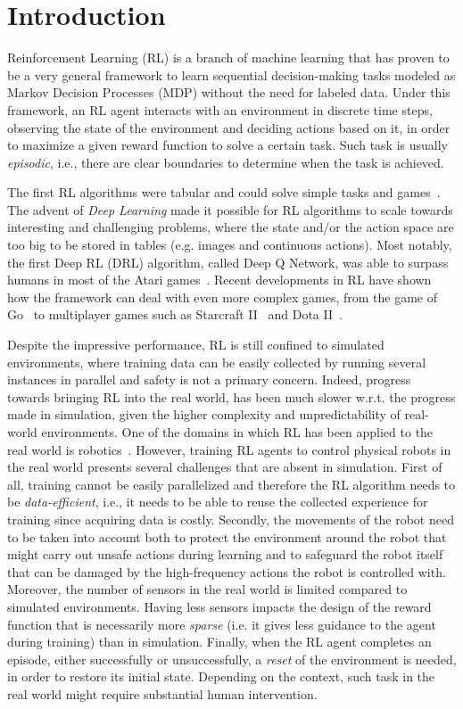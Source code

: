 \chapter{Introduction}

Reinforcement Learning (RL) is a branch of machine learning that has proven to be a very general framework to learn sequential decision-making tasks modeled as Markov Decision Processes (MDP) \citep{vanOtterlo2012} without the need for labeled data. Under this framework, an RL agent interacts with an environment in discrete time steps, observing the state of the environment and deciding actions based on it, in order to maximize a given reward function to solve a certain task. Such task is usually \textit{episodic}, i.e., there are clear boundaries to determine when the task is achieved.

The first RL algorithms were tabular and could solve simple tasks and games~\cite{Sutton1998}. The advent of \textit{Deep Learning} made it possible for RL algorithms to scale towards interesting and challenging problems, where the state and/or the action space are too big to be stored in tables (e.g. images and continuous actions). Most notably, the first Deep RL (DRL) algorithm, called Deep Q Network, was able to surpass humans in most of the Atari games~\cite{atari}. Recent developments in RL have shown how the framework can deal with even more complex games, from the game of Go~\cite{alphago} to multiplayer games such as Starcraft II~\cite{alphastar} and Dota II~\cite{opeaifive}.

Despite the impressive performance, RL is still confined to simulated environments, where training data can be easily collected by running several instances in parallel and safety is not a primary concern. Indeed, progress towards bringing RL into the real world, has been much slower w.r.t. the progress made in simulation, given the higher complexity and unpredictability of real-world environments. One of the domains in which RL has been applied to the real world is robotics~\cite{smith2022walk,pmlr-v164-raffin22a,gu2017deep}. However, training RL agents to control physical robots in the real world presents several challenges that are absent in simulation. First of all, training cannot be easily parallelized and therefore the RL algorithm needs to be \textit{data-efficient}, i.e., it needs to be able to reuse the collected experience for training since acquiring data is costly. Secondly, the movements of the robot need to be taken into account both to protect the environment around the robot that might carry out unsafe actions during learning and to safeguard the robot itself that can be damaged by the high-frequency actions the robot is controlled with. Moreover, the number of sensors in the real world is limited compared to simulated environments. Having less sensors impacts the design of the reward function that is necessarily more \textit{sparse} (i.e. it gives less guidance to the agent during training) than in simulation. Finally, when the RL agent completes an episode, either successfully or unsuccessfully, a \textit{reset} of the environment is needed, in order to restore its initial state. Depending on the context, such task in the real world might require substantial human intervention.

